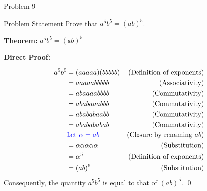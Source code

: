 \begin{problem}{Problem 9}
    \begin{statement}{Problem Statement}
        Prove that $a^{5}b^{5} = (ab)^{5}$.
    \end{statement}

    \begin{Highlight}[Solution]
        \textbf{Theorem:} $a^{5}b^{5} = (ab)^{5}$ \vspace*{1em}

        \textbf{Direct Proof:} \vspace*{1em}

        \begin{align*}
            a^{5}b^{5} & = (aaaaa)(bbbbb) & \text{(Definition of exponents)} \\
            & = aaaaabbbbb & \text{(Associativity)} \\
            & = abaaaabbbb & \text{(Commutativity)} \\
            & = ababaaabbb & \text{(Commutativity)} \\
            & = abababaabb & \text{(Commutativity)} \\
            & = ababababab & \text{(Commutativity)} \\
            & \textcolor{blue}{\text{Let } \alpha = ab} & \text{(Closure by renaming $ab$)} \\
            & = \alpha \alpha \alpha \alpha \alpha & \text{(Substitution)} \\
            & = \alpha^{5} & \text{(Definition of exponents)} \\
            & = (ab)^{5} & \text{(Substitution)}
        \end{align*}
        Consequently, the quantity $a^{5}b^{5}$ is equal to that of $(ab)^{5}$. \qed
    \end{Highlight}
\end{problem}

